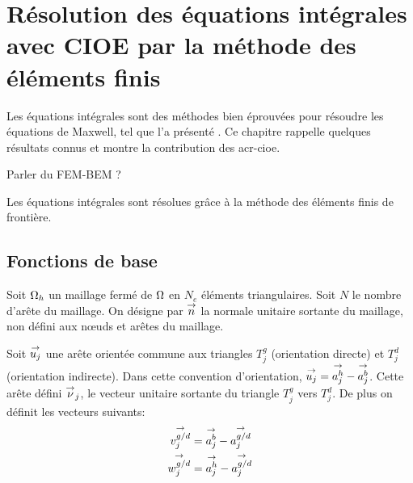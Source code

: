 \section{Résolution des équations intégrales avec CIOE par la méthode des éléments finis}

  \newcommand{\phij}{\vect{\phi_j}}
  \newcommand{\pj}{\vect{p_j}}
  \newcommand{\qj}{\vect{q_j}}
  \newcommand{\nuj}{\vect{\nu_j}}
  \newcommand{\uj}{\vect{u_j}}

  Les équations intégrales sont des méthodes bien éprouvées pour résoudre les équations de Maxwell, tel que l'a présenté \cite{nedelec_acoustic_2001}. Ce chapitre rappelle quelques résultats connus et montre la contribution des \gls{acr-cioe}.

  \begin{TODO}
    Parler du FEM-BEM ?
  \end{TODO}

  Les équations intégrales sont résolues grâce à la méthode des éléments finis de frontière.

  \subsection{Fonctions de base}

    Soit \(\Omega_h\) un maillage fermé de \(\Omega\) en \(N_e\) éléments triangulaires. Soit \(N\) le nombre d'arête du maillage. On désigne par \({\overset{\rightarrow}{n}}\) la normale unitaire sortante du maillage, non défini aux nœuds et arêtes du maillage.

    Soit \(\uj\) une arête orientée commune aux triangles \(T_j^g\) (orientation directe) et \(T_j^d\) (orientation indirecte). Dans cette convention d'orientation, \(\uj = \vect{a_j^h}-\vect{a_j^b}\). Cette arête défini \({\overset{\rightarrow}{\nu}}_j\), le vecteur unitaire sortante du triangle \(T_j^g\) vers \(T_j^d\).  De plus on définit les vecteurs suivants:
    \begin{align}
      {\overset{\rightarrow}{v_j^{g/d}}} &= {\overset{\rightarrow}{a_j^b}} - {\overset{\rightarrow}{a_j^{g/d}}} \\
      {\overset{\rightarrow}{w_j^{g/d}}} &= {\overset{\rightarrow}{a_j^h}} - {\overset{\rightarrow}{a_j^{g/d}}}
    \end{align}

    \newcommand{\ncouche}{6}
    \newcommand{\xa}{-0.2}
    \newcommand{\ya}{0.0}
    \newcommand{\xb}{3}
    \newcommand{\yb}{0.3}
    \newcommand{\xc}{0.4}
    \newcommand{\yc}{4}
    \newcommand{\xd}{4}
    \newcommand{\yd}{3.4}

